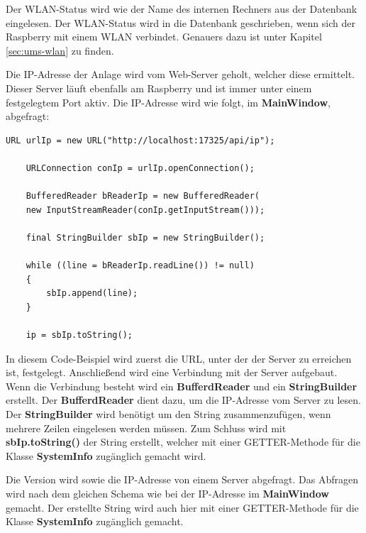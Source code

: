 Der WLAN-Status wird wie der Name des internen Rechners aus der Datenbank eingelesen. Der WLAN-Status wird in die Datenbank geschrieben, wenn sich der Raspberry mit einem WLAN verbindet. Genauers dazu ist unter Kapitel \ref{sec:ums-wlan} zu finden.

\vspace{10pt}

Die IP-Adresse der Anlage wird vom Web-Server geholt, welcher diese ermittelt. Dieser Server läuft ebenfalls am Raspberry und ist immer unter einem festgelegtem Port aktiv. Die \ac{IP}-Adresse wird wie folgt, im \textbf{MainWindow}, abgefragt:
\begin{lstlisting}[style=JavaStyle, caption=Abfragen der \ac{IP}-Adresse]
	URL urlIp = new URL("http://localhost:17325/api/ip");
	
	URLConnection conIp = urlIp.openConnection();
	
	BufferedReader bReaderIp = new BufferedReader(
	new InputStreamReader(conIp.getInputStream()));    
	
	final StringBuilder sbIp = new StringBuilder();
	
	while ((line = bReaderIp.readLine()) != null)
	{
		sbIp.append(line);
	}
            
	ip = sbIp.toString();    
\end{lstlisting}
In diesem Code-Beispiel wird zuerst die \ac{URL}, unter der der Server zu erreichen ist, festgelegt. Anschließend wird eine Verbindung mit der Server aufgebaut. Wenn die Verbindung besteht wird ein \textbf{BufferdReader} und ein \textbf{StringBuilder} erstellt. Der \textbf{BufferdReader} dient dazu, um die \ac{IP}-Adresse vom Server zu lesen. Der \textbf{StringBuilder} wird benötigt um den String zusammenzufügen, wenn mehrere Zeilen eingelesen werden müssen. Zum Schluss wird mit \textbf{sbIp.toString()} der String erstellt, welcher mit einer GETTER-Methode für die Klasse \textbf{SystemInfo} zugänglich gemacht wird.

\vspace{10pt}

Die Version wird sowie die \ac{IP}-Adresse von einem Server abgefragt. Das Abfragen wird nach dem gleichen Schema wie bei der \ac{IP}-Adresse im \textbf{MainWindow} gemacht. Der erstellte String wird auch hier mit einer GETTER-Methode für die Klasse \textbf{SystemInfo} zugänglich gemacht.


\newpage


